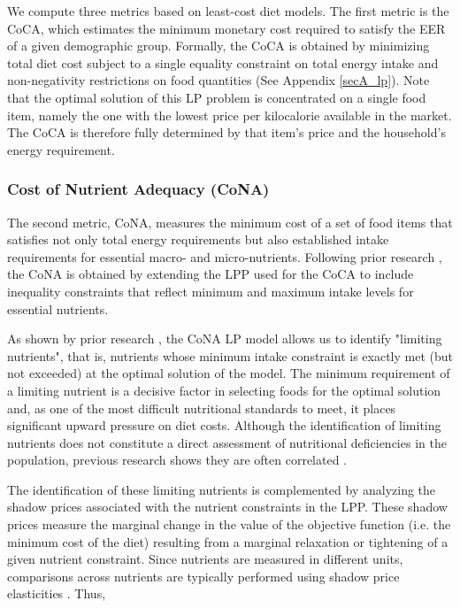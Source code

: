 \documentclass[Afour, sageh,times]{sagej}
\begin{document}
We compute three metrics based on least-cost diet models. The first metric is the CoCA, which estimates the minimum monetary cost required to satisfy the EER of a given demographic group. Formally, the CoCA is obtained by minimizing total diet cost subject to a single equality constraint on total energy intake and non-negativity restrictions on food quantities (See Appendix \ref{secA_lp}). Note that the optimal solution of this LP problem is concentrated on a single food item, namely the one with the lowest price per kilocalorie available in the market. The CoCA is therefore fully determined by that item's price and the household's energy requirement.


\subsubsection{Cost of Nutrient Adequacy (CoNA)}

The second metric, CoNA, measures the minimum cost of a set of food items that satisfies not only total energy requirements but also established intake requirements for essential macro- and micro-nutrients. Following prior research \citep{Masters2018,dePee2021,Deptford2017,Yoshioka2026}, the CoNA is obtained by extending the LPP used for the CoCA to include inequality constraints that reflect minimum and maximum intake levels for essential nutrients.

As shown by prior research \citep{Briend2003,Frega2012,Chungchunlam2021}, the CoNA LP model allows us to identify "limiting nutrients", that is, nutrients whose minimum intake constraint is exactly met (but not exceeded) at the optimal solution of the model.  The minimum requirement of a limiting nutrient is a decisive factor in selecting foods for the optimal solution and, as one of the most difficult nutritional standards to meet, it places significant upward pressure on diet costs. Although the identification of limiting nutrients does not constitute a direct assessment of nutritional deficiencies in the population, previous research shows they are often correlated \citep{Frega2012}.

The identification of these limiting nutrients is complemented by analyzing the shadow prices associated with the nutrient constraints in the LPP. These shadow prices measure the marginal change in the value of the objective function (i.e. the minimum cost of the diet) resulting from a marginal relaxation or tightening of a given nutrient constraint. Since nutrients are measured in different units, comparisons across nutrients are typically performed using shadow price elasticities \citep{Masters2018}. Thus,
\end{document}
